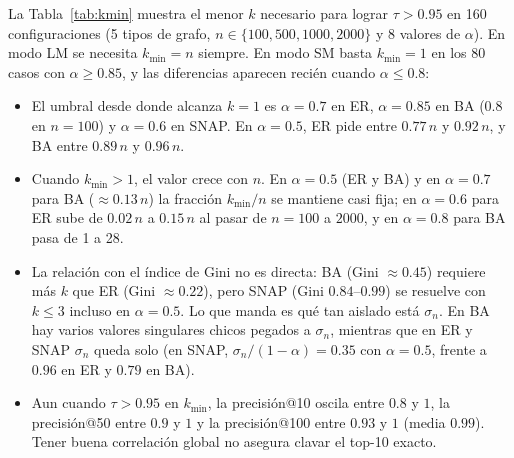 \documentclass[11pt,a4paper]{article}
\begin{document}
La Tabla~\ref{tab:kmin} muestra el menor $k$ necesario para lograr $\tau>0.95$ en 160 configuraciones (5 tipos de grafo, $n\in\{100,500,1000,2000\}$ y 8 valores de $\alpha$). En modo LM se necesita $k_{\min}=n$ siempre. En modo SM basta $k_{\min}=1$ en los 80 casos con $\alpha\ge 0.85$, y las diferencias aparecen reci\'en cuando $\alpha\le 0.8$:
\begin{itemize}\setlength{\itemsep}{2pt}
 \item El umbral desde donde alcanza $k=1$ es $\alpha=0.7$ en ER, $\alpha=0.85$ en BA ($0.8$ en $n=100$) y $\alpha=0.6$ en SNAP. En $\alpha=0.5$, ER pide entre $0.77\,n$ y $0.92\,n$, y BA entre $0.89\,n$ y $0.96\,n$.
 \item Cuando $k_{\min}>1$, el valor crece con $n$. En $\alpha=0.5$ (ER y BA) y en $\alpha=0.7$ para BA ($\approx 0.13\,n$) la fracci\'on $k_{\min}/n$ se mantiene casi fija; en $\alpha=0.6$ para ER sube de $0.02\,n$ a $0.15\,n$ al pasar de $n=100$ a $2000$, y en $\alpha=0.8$ para BA pasa de 1 a 28.
 \item La relaci\'on con el \'indice de Gini no es directa: BA (Gini $\approx 0.45$) requiere m\'as $k$ que ER (Gini $\approx 0.22$), pero SNAP (Gini $0.84$--$0.99$) se resuelve con $k\le 3$ incluso en $\alpha=0.5$. Lo que manda es qu\'e tan aislado est\'a $\sigma_n$. En BA hay varios valores singulares chicos pegados a $\sigma_n$, mientras que en ER y SNAP $\sigma_n$ queda solo (en SNAP, $\sigma_n/(1-\alpha)=0.35$ con $\alpha=0.5$, frente a $0.96$ en ER y $0.79$ en BA).
 \item Aun cuando $\tau>0.95$ en $k_{\min}$, la precisi\'on@10 oscila entre $0.8$ y $1$, la precisi\'on@50 entre $0.9$ y $1$ y la precisi\'on@100 entre $0.93$ y $1$ (media $0.99$). Tener buena correlaci\'on global no asegura clavar el top-10 exacto.
\end{itemize}
\end{document}
